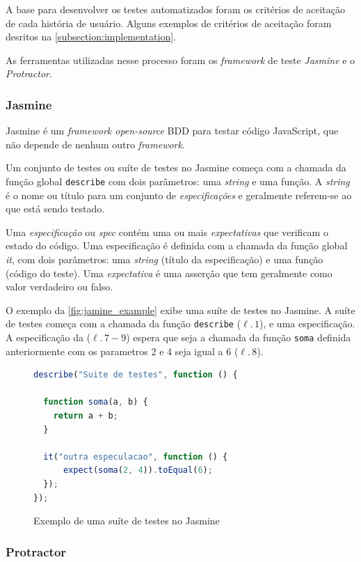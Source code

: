 A base para desenvolver os testes automatizados foram os critérios de aceitação de cada história de usuário.
Alguns exemplos de critérios de aceitação foram desritos na \autoref{subsection:implementation}.

As ferramentas utilizadas nesse processo foram os \textit{framework} de teste \textit{Jasmine} e o \textit{Protractor}.

\subsubsection{Jasmine}

Jasmine é um \textit{framework open-source} BDD para testar código JavaScript, que não depende de nenhum outro \textit{framework}.

Um conjunto de testes ou suíte de testes no Jasmine começa com a chamada da função global
\texttt{describe} com dois parâmetros: uma \textit{string} e uma função. A \textit{string} é o nome ou título
para um conjunto de \textit{especificações} e geralmente referem-se ao que está sendo testado.

Uma \textit{especificação} ou \textit{spec} contém uma ou mais \textit{expectativas} que verificam o estado do código.
Uma especificação é definida com a chamada da função global \textit{it}, com dois parâmetros: uma \textit{string} (título da
especificação) e uma função (código do teste).
Uma \textit{expectativa} é uma asserção que tem geralmente como valor verdadeiro ou falso.

O exemplo da \autoref{fig:jamine_example} exibe uma suíte de testes no Jasmine. A suíte de
testes começa com a chamada da função \texttt{describe} ($\ell.\,1$), e uma especificação.
A especificação da ($\ell.\,7-9$) espera que seja a chamada da função \texttt{soma} definida
anteriormente com os parametros 2 e 4 seja igual a 6 ($\ell.\,8$).

\begin{figure}[!ht]
\caption{Exemplo de uma suíte de testes no Jasmine}
\label{fig:jamine_example}
\begin{lstlisting}[language=JavaScript]
describe("Suite de testes", function () {

  function soma(a, b) {
    return a + b;
  }

  it("outra especulacao", function () {
      expect(soma(2, 4)).toEqual(6);
  });
});
\end{lstlisting}
\doautor
\end{figure}

\subsubsection{Protractor}

